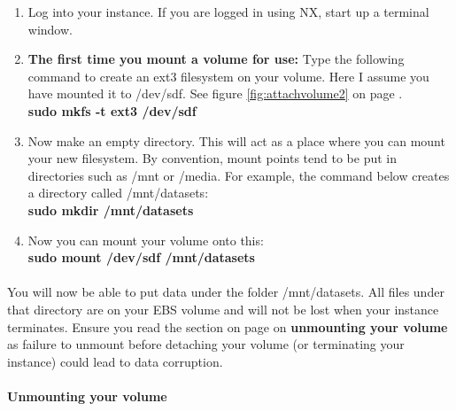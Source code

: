 \begin{enumerate}
\item Log into your instance. If you are logged in using NX, start up a terminal window.
\item \textbf{The first time you mount a volume for use:} Type the following command to create an ext3 filesystem on your volume. Here I assume you have mounted it to /dev/sdf. See figure \ref{fig:attachvolume2} on page \pageref{fig:attachvolume2}.
\\\textbf{sudo mkfs -t ext3 /dev/sdf }
\item Now make an empty directory. This will act as a place where you can mount your new filesystem. By convention, mount points tend to be put in directories such as /mnt or /media. For example, the command below creates a directory called /mnt/datasets:
\\\textbf{sudo mkdir /mnt/datasets}
\item Now you can mount your volume onto this:
\\\textbf{sudo mount /dev/sdf /mnt/datasets}
\end{enumerate}

\paragraph{}You will now be able to put data under the folder /mnt/datasets. All files under that directory are on your EBS volume and will not be lost when your instance terminates. Ensure you read the section on page \pageref{text:unmounting} on \textbf{unmounting your volume} as failure to unmount before detaching your volume (or terminating your instance) could lead to data corruption. 

\paragraph{Unmounting your volume}

